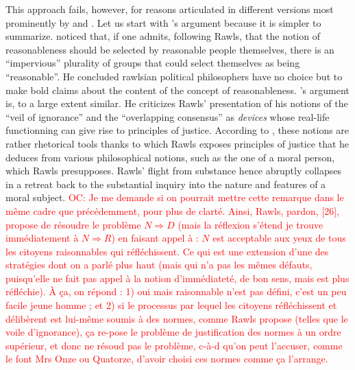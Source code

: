 \documentclass[preprint, french, english, 11pt]{elsarticle}%
\newcommand{\commentOC}[1]{\textcolor{red}{OC: #1}}
\begin{document}
This approach fails, however, for reasons articulated in different versions most prominently by \cite{habermas_reconciliation_1995} and \cite{estlund_democratic_2009}. Let us start with \cite{estlund_democratic_2009}'s argument because it is simpler to summarize. \cite{estlund_democratic_2009} noticed that, if one admits, following Rawls, that the notion of reasonableness should be selected by reasonable people themselves, there is an ``impervious'' plurality of groups that could select themselves as being ``reasonable''. He concluded rawlsian political philosophers have no choice but to make bold claims about the content of the concept of reasonableness. \cite{habermas_reconciliation_1995}'s argument is, to a large extent similar. He criticizes Rawls' presentation of his notions of the ``veil of ignorance'' and the ``overlapping consensus'' as \emph{devices} whose real-life functionning can give rise to principles of justice. According to \cite{habermas_reconciliation_1995}, these notions are rather rhetorical tools thanks to which Rawls exposes principles of justice that he deduces from various philosophical notions, such as the one of a moral person, which Rawls presupposes. Rawls' flight from substance hence abruptly collapses in a retreat back to the substantial inquiry into the nature and features of a moral subject.
\commentOC{Je me demande si on pourrait mettre cette remarque dans le même cadre que précédemment, pour plus de clarté. Ainsi, Rawls, pardon, [26], propose de résoudre le problème $N ⇒ D$ (mais la réflexion s’étend je trouve immédiatement à $N ⇒ R$) en faisant appel à : $N$ est acceptable aux yeux de tous les citoyens raisonnables qui réfléchissent. Ce qui est une extension d’une des stratégies dont on a parlé plus haut (mais qui n’a pas les mêmes défauts, puisqu’elle ne fait pas appel à la notion d’immédiateté, de bon sens, mais est plus réfléchie). À ça, on répond : 1) oui mais raisonnable n’est pas défini, c’est un peu facile jeune homme ; et 2) si le processus par lequel les citoyens réfléchissent et délibèrent est lui-même soumis à des normes, comme Rawls propose (telles que le voile d’ignorance), ça re-pose le problème de justification des normes à un ordre supérieur, et donc ne résoud pas le problème, c-à-d qu’on peut l’accuser, comme le font Mrs Onze ou Quatorze, d’avoir choisi ces normes comme ça l’arrange.}
\end{document}
